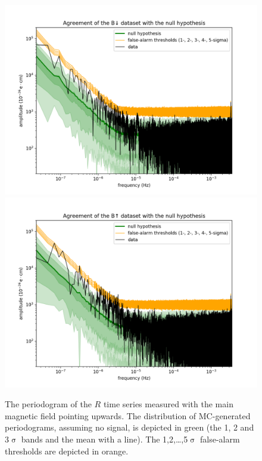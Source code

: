 \begin{figure}
  \centering
  \includegraphics[width=0.9\linewidth]{gfx/axions/winddeltah4mm_Bdown_detection.png}
  \includegraphics[width=0.9\linewidth]{gfx/axions/winddeltah4mm_Bup_detection.png}
  \caption{The periodogram of the $R$ time series measured with the main magnetic field pointing upwards. The distribution of MC-generated periodograms, assuming no signal, is depicted in green (the 1, 2 and 3$\upsigma$ bands and the mean with a line). The 1,2,…,5$\upsigma$ false-alarm thresholds are depicted in orange.}\label{fig:axions_wind_detection}
\end{figure}


